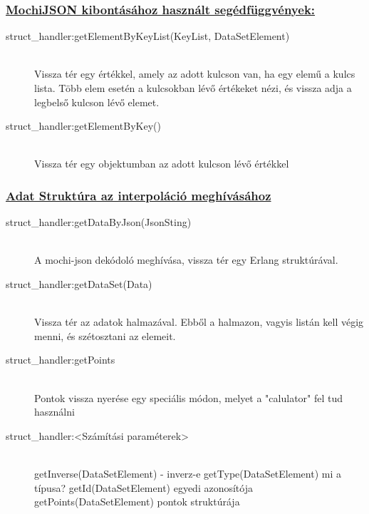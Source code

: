 	\subsubsection{\underline{
		MochiJSON kibontásához használt segédfüggvények:
	}}
	\begin{description}
		\item[struct\_handler:getElementByKeyList(KeyList, DataSetElement)] \hfill \\ 
		Vissza tér egy értékkel, amely az adott kulcson van, ha egy elemű a kulcs lista. Több elem esetén a kulcsokban lévő értékeket nézi, és vissza adja a legbelső kulcson lévő elemet.

		\item[struct\_handler:getElementByKey()] \hfill \\ 
		Vissza tér egy objektumban az adott kulcson lévő értékkel
	\end{description}
	\subsubsection{\underline{Adat Struktúra az interpoláció meghívásához}}
	\begin{description}

		\item[struct\_handler:getDataByJson(JsonSting)] \hfill \\
		A mochi-json dekódoló meghívása, vissza tér egy Erlang struktúrával.
		
		\item[struct\_handler:getDataSet(Data)]\hfill \\ 
		Vissza tér az adatok halmazával. Ebből a halmazon, vagyis listán kell végig menni, és szétosztani az elemeit. 
		
		\item[struct\_handler:getPoints] \hfill \\
		Pontok vissza nyerése egy speciális módon, melyet a "calulator" fel tud használni

		

		\item[struct\_handler:<Számítási paraméterek>] \hfill \\ 
		getInverse(DataSetElement) - inverz-e \newline
		getType(DataSetElement) mi a típusa? \newline
		getId(DataSetElement) egyedi azonosítója \newline
		getPoints(DataSetElement) pontok struktúrája
	\end{description}
